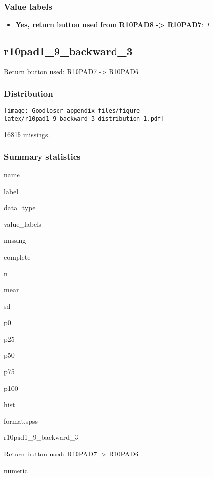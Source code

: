 \documentclass[]{book}
\providecommand{\tightlist}{%
  \setlength{\itemsep}{0pt}\setlength{\parskip}{0pt}}
\begin{document}
\subsubsection{Value labels}\label{r10pad1_9_backward_2_labels}

\begin{itemize}
\tightlist
\item
  \textbf{Yes, return button used from R10PAD8 -\textgreater{} R10PAD7}:
  \emph{1}
\end{itemize}

\subsection{r10pad1\_9\_backward\_3}\label{r10pad1_9_backward_3}

Return button used: R10PAD7 -\textgreater{} R10PAD6

\subsubsection{Distribution}\label{r10pad1_9_backward_3_distribution}

\texttt{[image: Goodloser-appendix\_files/figure-latex/r10pad1\_9\_backward\_3\_distribution-1.pdf]}

16815 missings.

\subsubsection{Summary statistics}\label{r10pad1_9_backward_3_summary}

name

label

data\_type

value\_labels

missing

complete

n

mean

sd

p0

p25

p50

p75

p100

hist

format.spss

r10pad1\_9\_backward\_3

Return button used: R10PAD7 -\textgreater{} R10PAD6

numeric
\end{document}
